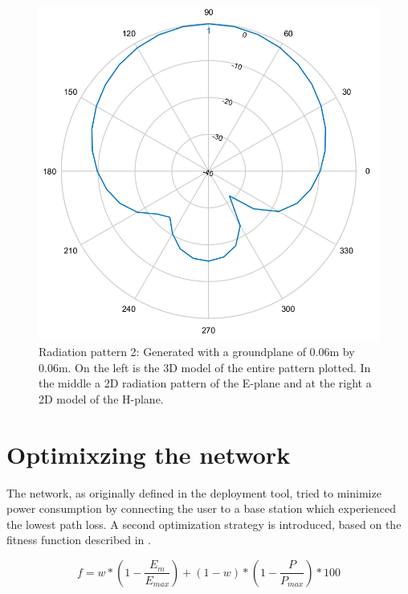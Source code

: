 \begin{figure}[!htb]
  \includegraphics[width=\linewidth]{../images/pattern1/hp.png}
\endminipage
  \caption{Radiation pattern 2: Generated with a groundplane of 0.06m by 0.06m. On the left is the 3D model of the entire pattern plotted. In the middle a 2D radiation pattern of the E-plane and at the right a 2D model of the H-plane.}
 \label{radpattern1}
\end{figure}

\section{Optimixzing the network}
\label{sec:methodology:optimizingTheNetwork}
The network, as originally defined in the deployment tool, tried to minimize power consumption by connecting the user to a base station which
experienced the lowest path loss. A second optimization strategy is introduced, based on the fitness function described in \cite{J1}.

\begin{equation} 
f = w * \left(1 - \frac{E_m}{E_{max}}\right) + (1 - w)*\left(1 - \frac{P}{P_{max}}\right) * 100
\label{eq:fitnessfunction}
\end{equation}

